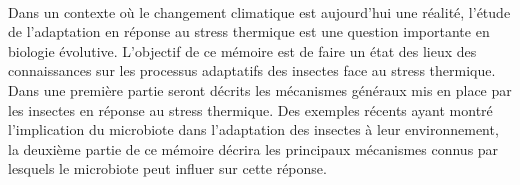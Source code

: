 \paragraph*{} %
\label{par:intro3}

Dans un contexte où le changement climatique est aujourd'hui une réalité, l'étude de l'adaptation en réponse au stress thermique est une question importante en biologie évolutive.
L'objectif de ce mémoire est de faire un état des lieux des connaissances sur les processus adaptatifs des insectes face au stress thermique.
Dans une première partie seront décrits les mécanismes généraux mis en place par les insectes en réponse au stress thermique.
Des exemples récents ayant montré l'implication du microbiote dans l'adaptation des insectes à leur environnement, la deuxième partie de ce mémoire décrira les principaux mécanismes connus par lesquels le microbiote peut influer sur cette réponse.


%


